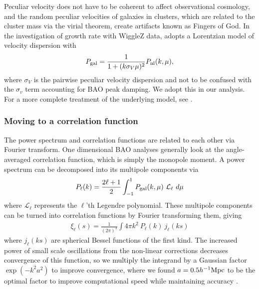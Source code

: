 \documentclass[a4paper,fleqn,usenatbib]{mnras}
\begin{document}
Peculiar velocity does not have to be coherent to affect observational cosmology, and the random peculiar velocities of galaxies in clusters, which are related to the cluster mass via the virial theorem, create artifacts known as Fingers of God. In the investigation of growth rate with WiggleZ data, \citet{BlakeBroughColless2011} adopts a Lorentzian model of velocity dispersion with
\begin{align}
	P_{\rm{gal}} = \frac{1}{1 + (k \sigma_V \mu)^2}  P_{\rm{nl}}(k, \mu), \label{eq:lorentzian}
\end{align}
where $\sigma_V$ is the pairwise peculiar velocity dispersion and not to be confused with the $\sigma_v$ term accounting for BAO peak damping. We adopt this in our analysis. For a more complete treatment of the underlying model, see \citet{HintonThesis2015}.









\subsubsection{Moving to a correlation function} \label{sec:prior:cor}

The power spectrum and correlation functions are related to each other via Fourier transform. One dimensional BAO analyses generally look at the angle-averaged correlation function, which is simply the monopole moment. A power spectrum can be decomposed into its multipole components via 
\begin{align}
	P_{\ell}(k) = \frac{2\ell + 1}{2} \int_{-1}^1 P_{\rm{gal}}(k, \mu) \ \mathcal{L}_\ell \  d\mu
\end{align}
where $\mathcal{L}_\ell$ represents the $\ell$'th Legendre polynomial. These multipole components can be turned into correlation functions by Fourier transforming them, giving
\begin{align}
	\xi_\ell(s) = \frac{1}{(2\pi)^3} \int 4\pi k^2 \ P_\ell(k) \ j_\ell(ks)
\end{align}
where $j_\ell(ks)$ are spherical Bessel functions of the first kind. The increased power of small scale oscillations from the non-linear corrections decreases convergence of this function, so we multiply the integrand by a Gaussian factor $\exp(-k^2 a^2)$ to improve convergence, where we found $a=0.5 h^{-1} \rm{Mpc}$ to be the optimal factor to improve computational speed while maintaining accuracy \citep{HintonThesis2015}.  \citep[The results are not sensitive to the exact choice of $a$;][set $a= 1\, h^{-1}\rm{Mpc}$.]{AndersonAubourg2012} 
\end{document}
